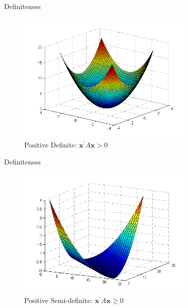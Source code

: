 \documentclass[11pt, xcolor={dvipsnames}, hyperref={colorlinks, allcolors=Blue}]{beamer}
\begin{document}
\begin{frame}{Definiteness}
\begin{figure}
	\centering
	\includegraphics[width=0.75\textwidth]{quadraticform1.png}
	\caption{Positive Definite: $\mathbf{x}^{\prime}A\mathbf{x} > 0$}
\end{figure}
\end{frame}
\begin{frame}{Definiteness}
\begin{figure}
	\centering
	\includegraphics[width=0.75\textwidth]{quadraticform4.png}
	\caption{Positive Semi-definite: $\mathbf{x}^{\prime}A\mathbf{x} \geq 0$}
\end{figure}
\end{frame}
\end{document}
